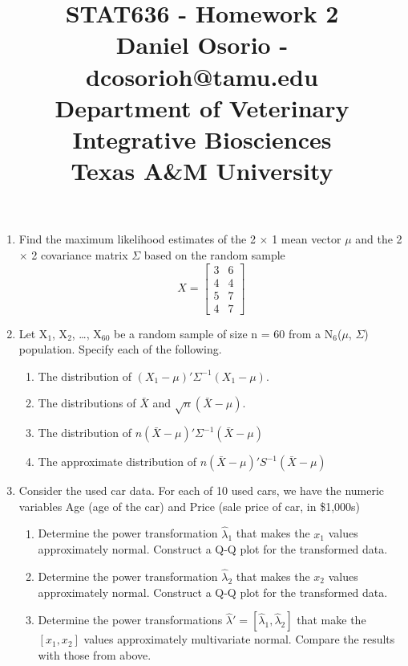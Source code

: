 \documentclass[12pt,a4paper]{paper}
\begin{document}
\title{STAT636 - Homework 2\\\small{Daniel Osorio - dcosorioh@tamu.edu\\Department of Veterinary Integrative Biosciences\\Texas A\&M University}}
\maketitle

\begin{enumerate}
\item Find the maximum likelihood estimates of the 2 $\times$ 1 mean vector $\mu$ and the 2 $\times$ 2 covariance matrix $\Sigma$ based on the random sample
\[X = \left[\begin{array}{cc}3 & 6\\4 & 4\\5 & 7\\4 & 7\end{array}\right]\]
\item Let X$_{1}$, X$_{2}$, \dots, X$_{60}$ be a random sample of size n = 60 from a N$_{6}$($\mu$, $\Sigma$) population. Specify each of the following.
\begin{enumerate}
\item The distribution of $(X_{1} - \mu)'\Sigma^{-1}(X_{1} - \mu)$.
\item The distributions of $\bar{X}$ and $\sqrt{n}(\bar{X} - \mu)$.
\item The distribution of $n(\bar{X}-\mu)'\Sigma^{-1}(\bar{X} - \mu)$
\item The approximate distribution of $n(\bar{X}-\mu)'S^{-1}(\bar{X} - \mu)$
\end{enumerate}
\item Consider the used car data. For each of 10 used cars, we have the numeric variables Age
(age of the car) and Price (sale price of car, in \$1,000s)
\begin{enumerate}
\item Determine the power transformation $\hat{\lambda}_{1}$ that makes the $x_{1}$ values approximately normal. Construct a Q-Q plot for the transformed data.
\item Determine the power transformation $\hat{\lambda}_{2}$ that makes the $x_{2}$ values approximately normal. Construct a Q-Q plot for the transformed data.
\item Determine the power transformations $\hat{\lambda}' = \left[\hat{\lambda}_{1},\hat{\lambda}_{2}\right]$ that make the $\left[x_{1},x_{2}\right]$ values approximately multivariate normal. Compare the results with those from above.

\end{enumerate}
\end{enumerate}
\end{document}

